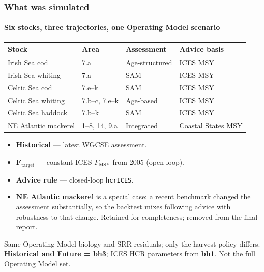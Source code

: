 \documentclass[
  aspectratio=169,
  t,
  onlytextwidth,
  10pt,
]{beamer}
\newcommand{\Fmsy}{F_{\mathrm{MSY}}}
\begin{document}
\begin{frame}
  \frametitle{What was simulated}
  \framesubtitle{Six stocks, three trajectories, one Operating Model scenario}

  {\small
  \begin{tabular}{@{}llll@{}}
    \toprule
    Stock & Area & Assessment & Advice basis \\
    \midrule
    Irish Sea cod        & 7.a              & Age-structured & ICES MSY \\
    Irish Sea whiting    & 7.a              & SAM            & ICES MSY \\
    Celtic Sea cod       & 7.e--k           & SAM            & ICES MSY \\
    Celtic Sea whiting   & 7.b--c, 7.e--k   & Age-based      & ICES MSY \\
    Celtic Sea haddock   & 7.b--k           & SAM            & ICES MSY \\
    NE Atlantic mackerel & 1--8, 14, 9.a    & Integrated     & Coastal States MSY \\
    \bottomrule
  \end{tabular}}

  \vspace{0.45em}
  \begin{itemize}
    \item \textbf{Historical} --- latest WGCSE assessment.
    \item $\boldsymbol{F}_{\mathrm{target}}$ --- constant ICES $\Fmsy$ from 2005 (open-loop).
    \item \textbf{Advice rule} --- closed-loop \texttt{hcrICES}.
    \item \textbf{NE Atlantic mackerel} is a special case: a recent benchmark changed the assessment substantially, so the backtest mixes following advice with robustness to that change. Retained for completeness; removed from the final report.
  \end{itemize}

  Same Operating Model biology and SRR residuals; only the harvest policy differs.
  \textbf{Historical and Future = bh3}; ICES HCR parameters from \textbf{bh1}.
  Not the full Operating Model set.
\end{frame}
\end{document}
